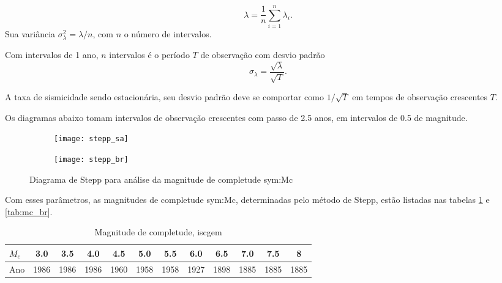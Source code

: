 \begin{equation}
	\ensuremath{
		\lambda =  \frac{1}{n}\sum_{i=1}^{n} \lambda_i.
	}
\label{eq:mwaf}
\end{equation}
Sua variância $\sigma_{\lambda}^2 =  \lambda/n$, com $n$ o número de intervalos.

Com intervalos de 1 ano, $n$ intervalos é o período $T$ de observação com desvio padrão
\begin{equation}
	\ensuremath{
		 \sigma_{\lambda} = \frac{\sqrt{\lambda}}{\sqrt{T}}.
	}
\label{eq:mwaf}
\end{equation}

A taxa de sismicidade sendo estacionária, seu desvio padrão deve se comportar como $1/\sqrt{T}$ em 
tempos de observação crescentes $T$.

Os diagramas abaixo tomam intervalos de observação crescentes com passo de 2.5 anos,
em intervalos de 0.5 de magnitude.
\begin{figure}[H]
	\centering
	\begin{subfigure}[b]{0.47\textwidth}
		  	\centering
			\texttt{[image: stepp\_sa]}
			\label{fig:sa_stepp}
	\end{subfigure}%
	\quad %
	\begin{subfigure}[b]{0.47\textwidth}
		  	\centering
			\texttt{[image: stepp\_br]}
			\label{fig:br_stepp}
    \end{subfigure}%
	\caption{Diagrama de Stepp para análise da magnitude de completude \gls{sym:Mc}}
	\label{fig:eq_stepp}
\end{figure}

Com esses parâmetros, as magnitudes de completude \gls{sym:Mc}, determinadas pelo método
de Stepp, estão listadas nas tabelas \ref{tab:mc_sa} e \ref{tab:mc_br}.

	\begin{table}[h]
	  	\centering
		\begin{tabular}{l|*{11}{c}}
		$M_c$ & 3.0  & 3.5  & 4.0  & 4.5  & 5.0  & 5.5  & 6.0  & 6.5  & 7.0  & 7.5  & 8 \\  \hline
		Ano   & 1986 & 1986 & 1986 & 1960 & 1958 & 1958 & 1927 & 1898 & 1885 & 1885 & 1885   \\
		\end{tabular}
		\caption{Magnitude de completude, \gls{iscgem}}
		\label{tab:mc_sa}
	\end{table}

